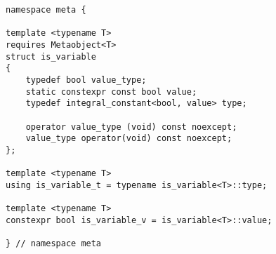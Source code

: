 
\begin{verbatim}
namespace meta {

template <typename T>
requires Metaobject<T>
struct is_variable
{
	typedef bool value_type;
	static constexpr const bool value;
	typedef integral_constant<bool, value> type;

	operator value_type (void) const noexcept;
	value_type operator(void) const noexcept;
};

template <typename T>
using is_variable_t = typename is_variable<T>::type;

template <typename T>
constexpr bool is_variable_v = is_variable<T>::value;

} // namespace meta
\end{verbatim}
